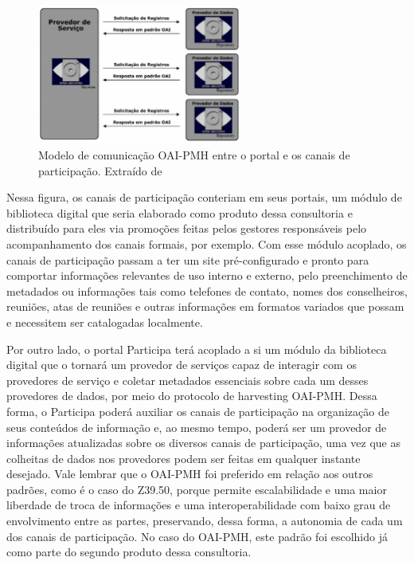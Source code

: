 \graphicspath{{figuras/}}
\begin{figure}[H]
\centering
\includegraphics[width=0.6\textwidth]{modelo-oaipmh}
\caption{Modelo de comunicação OAI-PMH entre o portal e os canais de participação. Extraído de \cite{renan2009interoperabilidade}}
\label{fig:modeloaipmh}
\end{figure}


Nessa figura, os canais de participação conteriam em seus portais, um módulo de biblioteca digital que seria elaborado como produto dessa consultoria e distribuído para eles via promoções feitas pelos gestores responsáveis pelo acompanhamento dos canais formais, por exemplo. Com esse módulo acoplado, os canais de participação passam a ter um site pré-configurado e pronto para comportar informações relevantes de uso interno e externo, pelo preenchimento de metadados ou informações tais como telefones de contato, nomes dos conselheiros, reuniões, atas de reuniões e outras informações em formatos variados que possam e necessitem ser catalogadas localmente.

Por outro lado, o portal Participa terá acoplado a si um módulo da biblioteca digital que o tornará um provedor de serviços capaz de interagir com os provedores de serviço e coletar metadados essenciais sobre cada um desses provedores de dados, por meio do protocolo de harvesting OAI-PMH. Dessa forma, o Participa poderá auxiliar os canais de participação na organização de seus conteúdos de informação e, ao mesmo tempo, poderá ser um provedor de informações atualizadas sobre os diversos canais de participação, uma vez que as colheitas de dados nos provedores podem ser feitas em qualquer instante desejado. Vale lembrar que o OAI-PMH foi preferido em relação aos outros padrões, como é o caso do Z39.50, porque permite escalabilidade e uma maior liberdade de troca de informações e uma interoperabilidade com baixo grau de envolvimento entre as partes, preservando, dessa forma, a autonomia de cada um dos canais de participação. No caso do OAI-PMH, este padrão foi escolhido já como parte do segundo produto dessa consultoria. 

